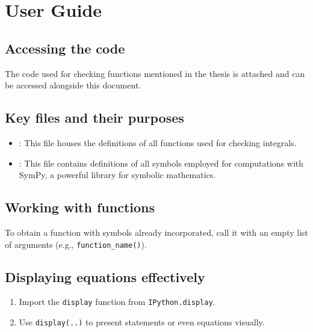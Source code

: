 \section{User Guide}\label{sec:userguide}

\subsection{Accessing the code}\label{subsec:accessing_code}

The code used for checking functions mentioned in the thesis is attached
and can be accessed alongside this document.

\subsection{Key files and their purposes}\label{subsec:key_files}

\begin{itemize}
    \item {}:
    This file houses the definitions of all functions used for checking integrals.
    \item {}:
    This file contains definitions of all symbols employed for computations with SymPy,
    a powerful library for symbolic mathematics.
\end{itemize}

\subsection{Working with functions}\label{subsec:working_with_funcs}

To obtain a function with symbols already incorporated,
call it with an empty list of arguments (e.g., \texttt{function_name()}).

\subsection{Displaying equations effectively}\label{subsec:displaying_eqs}

\begin{enumerate}
    \item Import the \texttt{display} function from \texttt{IPython.display}.
    \item Use \texttt{display(..)} to present statements or even equations visually.
\end{enumerate}

